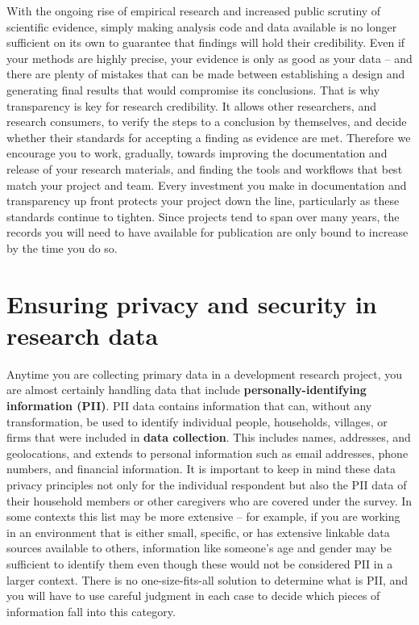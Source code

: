 With the ongoing rise of empirical research and increased public scrutiny of scientific evidence,
simply making analysis code and data available
is no longer sufficient on its own to guarantee that findings will hold their credibility.
Even if your methods are highly precise,
your evidence is only as good as your data --
and there are plenty of mistakes that can be made between
establishing a design and generating final results that would compromise its conclusions.
That is why transparency is key for research credibility.
It allows other researchers, and research consumers,
to verify the steps to a conclusion by themselves,
and decide whether their standards for accepting a finding as evidence are met.
Therefore we encourage you to work, gradually, towards improving
the documentation and release of your research materials,
and finding the tools and workflows that best match your project and team.
Every investment you make in documentation and transparency up front
protects your project down the line, particularly as these standards continue to tighten.
Since projects tend to span over many years,
the records you will need to have available for publication are
only bound to increase by the time you do so.



\section{Ensuring privacy and security in research data}

Anytime you are collecting primary data in a development research project,
you are almost certainly handling data that include \textbf{personally-identifying
	information (PII)}.
PII data contains information that can, without any transformation, be used to identify
individual people, households, villages, or firms that were included in \textbf{data collection}.
This includes names, addresses, and geolocations, and extends to personal information
such as email addresses, phone numbers, and financial information.
It is important to keep in mind these data privacy principles not only for the individual respondent but also the PII data of their household members or other caregivers who are covered under the survey.
In some contexts this list may be more extensive --
for example, if you are working in an environment that is either small, specific,
or has extensive linkable data sources available to others,
information like someone's age and gender may be sufficient to identify them
even though these would not be considered PII in a larger context.
There is no one-size-fits-all solution to determine what is PII, and you will have to use careful judgment in each case
to decide which pieces of information fall into this category.

